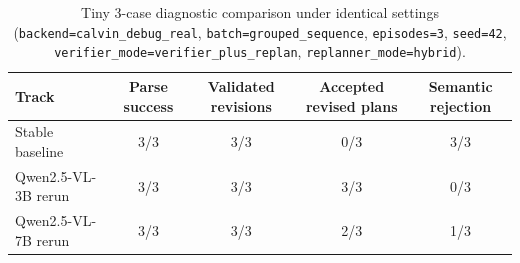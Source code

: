 \begin{table}[t]
\caption{Tiny 3-case diagnostic comparison under identical settings (\texttt{backend=calvin\_debug\_real}, \texttt{batch=grouped\_sequence}, \texttt{episodes=3}, \texttt{seed=42}, \texttt{verifier\_mode=verifier\_plus\_replan}, \texttt{replanner\_mode=hybrid}).}
\label{tab:tiny-qual}
\centering
\begin{tabular}{lcccc}
\toprule
Track & Parse success & Validated revisions & Accepted revised plans & Semantic rejection \\
\midrule
Stable baseline & 3/3 & 3/3 & 0/3 & 3/3 \\
Qwen2.5-VL-3B rerun & 3/3 & 3/3 & 3/3 & 0/3 \\
Qwen2.5-VL-7B rerun & 3/3 & 3/3 & 2/3 & 1/3 \\
\bottomrule
\end{tabular}
\end{table}
